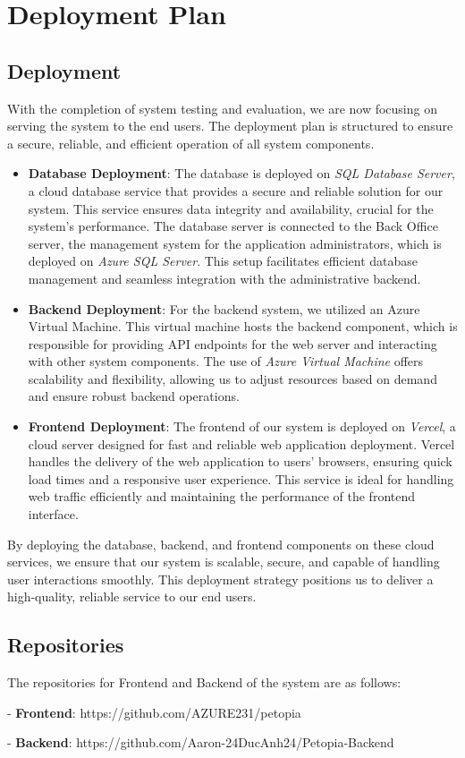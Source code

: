 \chapter{Deployment Plan}

\section{Deployment}

With the completion of system testing and evaluation, we are now focusing on serving the system to the end users. The deployment plan is structured to ensure a secure, reliable, and efficient operation of all system components.

\begin{itemize}
    \item \textbf{Database Deployment}: The database is deployed on \textit{SQL Database Server}, a cloud database service that provides a secure and reliable solution for our system. This service ensures data integrity and availability, crucial for the system's performance. The database server is connected to the Back Office server, the management system for the application administrators, which is deployed on \textit{Azure SQL Server}. This setup facilitates efficient database management and seamless integration with the administrative backend.
    \item \textbf{Backend Deployment}: For the backend system, we utilized an Azure Virtual Machine. This virtual machine hosts the backend component, which is responsible for providing API endpoints for the web server and interacting with other system components. The use of \textit{Azure Virtual Machine} offers scalability and flexibility, allowing us to adjust resources based on demand and ensure robust backend operations.
    \item \textbf{Frontend Deployment}: The frontend of our system is deployed on \textit{Vercel}, a cloud server designed for fast and reliable web application deployment. Vercel handles the delivery of the web application to users' browsers, ensuring quick load times and a responsive user experience. This service is ideal for handling web traffic efficiently and maintaining the performance of the frontend interface.
\end{itemize}

By deploying the database, backend, and frontend components on these cloud services, we ensure that our system is scalable, secure, and capable of handling user interactions smoothly. This deployment strategy positions us to deliver a high-quality, reliable service to our end users.

\section{Repositories}

The repositories for Frontend and Backend of the system are as follows:

- \textbf{Frontend}: https://github.com/AZURE231/petopia

- \textbf{Backend}: https://github.com/Aaron-24DucAnh24/Petopia-Backend

